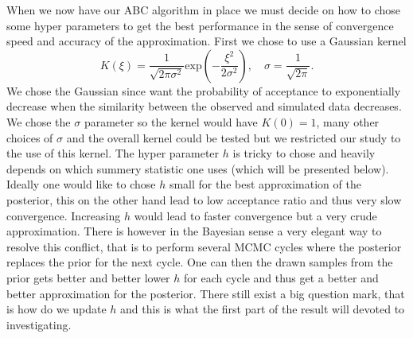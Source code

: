 \documentclass[11pt,a4paper]{article}
\begin{document}
When we now have our ABC algorithm in place we must decide on how to chose some hyper parameters to get the best performance in the sense of convergence speed and accuracy of the approximation. First we chose to use a Gaussian kernel 
\begin{equation*}
    K(\xi) = \frac{1}{\sqrt{2\pi \sigma^2}}\text{exp}\left(-\frac{\xi^2}{2\sigma^2}\right), \quad \sigma = \frac{1}{\sqrt{2\pi}}.
\end{equation*}
We chose the Gaussian since want the probability of acceptance to exponentially decrease when the similarity between the observed and simulated data decreases. We chose the $\sigma$ parameter so the kernel would have $K(0) = 1$, many other choices of $\sigma$ and the overall kernel could be tested but we restricted our study to the use of this kernel. The hyper parameter $h$ is tricky to chose and heavily depends on which summery statistic one uses (which will be presented below). Ideally one would like to chose $h$ small for the best approximation of the posterior, this on the other hand lead to low acceptance ratio and thus very slow convergence. Increasing $h$ would lead to faster convergence but a very crude approximation. There is however in the Bayesian sense a very elegant way to resolve this conflict, that is to perform several MCMC cycles where the posterior replaces the prior for the next cycle. One can then the drawn samples from the prior gets better and better lower $h$ for each cycle and thus get a better and better approximation for the posterior. There still exist a big question mark, that is how do we update $h$ and this is what the first part of the result will devoted to investigating. 
\end{document}
